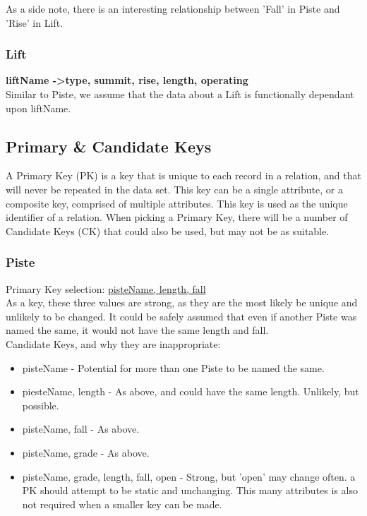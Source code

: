 \documentclass[11pt]{scrartcl} %
\begin{document}
As a side note, there is an interesting relationship between 'Fall' in Piste and 'Rise' in Lift.
\subsubsection{Lift}
\textbf{liftName -\textgreater  type, summit, rise, length, operating}
\\[0.2cm]
Similar to Piste, we assume that the data about a Lift is functionally dependant upon liftName.
\newpage

\subsection{Primary \& Candidate Keys}
A Primary Key (PK) is a key that is unique to each record in a relation, and that will never be repeated in the data set. This key can be a single attribute, or a composite key, comprised of multiple attributes. This key is used as the unique identifier of a relation. When picking a Primary Key, there will be a number of Candidate Keys (CK) that could also be used, but may not be as suitable.
\subsubsection{Piste}
Primary Key selection: \underline{pisteName, length, fall}\\
As a key, these three values are strong, as they are the most likely be unique and unlikely to be changed. It could be safely assumed that even if another Piste was named the same, it would not have the same length and fall.\\[0.2cm]
Candidate Keys, and why they are inappropriate:
\begin{itemize}[]
\item pisteName - Potential for more than one Piste to be named the same.
\item piesteName, length - As above, and could have the same length. Unlikely, but possible.
\item pisteName, fall - As above.
\item pisteName, grade - As above.
\item pisteName, grade, length, fall, open - Strong, but 'open' may change often. a PK should attempt to be static and unchanging. This many attributes is also not required when a smaller key can be made.
\end{itemize}
\end{document}
